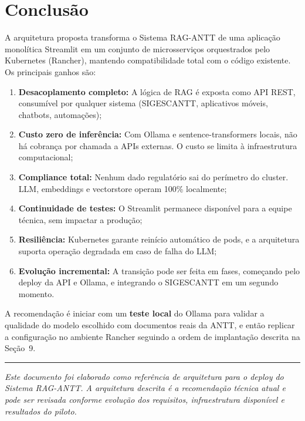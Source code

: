 \documentclass[12pt, a4paper]{article}
\begin{document}
\section{Conclusão}

A arquitetura proposta transforma o Sistema RAG-ANTT de uma aplicação monolítica Streamlit em um conjunto de microsserviços orquestrados pelo Kubernetes (Rancher), mantendo compatibilidade total com o código existente. Os principais ganhos são:

\begin{enumerate}[label=\textbf{\arabic*.}]
  \item \textbf{Desacoplamento completo:} A lógica de RAG é exposta como API REST, consumível por qualquer sistema (SIGESCANTT, aplicativos móveis, chatbots, automações);

  \item \textbf{Custo zero de inferência:} Com Ollama e sentence-transformers locais, não há cobrança por chamada a APIs externas. O custo se limita à infraestrutura computacional;

  \item \textbf{Compliance total:} Nenhum dado regulatório sai do perímetro do cluster. LLM, embeddings e vectorstore operam 100\% localmente;

  \item \textbf{Continuidade de testes:} O Streamlit permanece disponível para a equipe técnica, sem impactar a produção;

  \item \textbf{Resiliência:} Kubernetes garante reinício automático de pods, e a arquitetura suporta operação degradada em caso de falha do LLM;

  \item \textbf{Evolução incremental:} A transição pode ser feita em fases, começando pelo deploy da API e Ollama, e integrando o SIGESCANTT em um segundo momento.
\end{enumerate}

A recomendação é iniciar com um \textbf{teste local} do Ollama para validar a qualidade do modelo escolhido com documentos reais da ANTT, e então replicar a configuração no ambiente Rancher seguindo a ordem de implantação descrita na Seção~9.

\vspace{1cm}
\begin{center}
\rule{0.5\textwidth}{0.4pt}
\end{center}
\vspace{0.5cm}

\noindent\textit{Este documento foi elaborado como referência de arquitetura para o deploy do Sistema RAG-ANTT. A arquitetura descrita é a recomendação técnica atual e pode ser revisada conforme evolução dos requisitos, infraestrutura disponível e resultados do piloto.}
\end{document}
